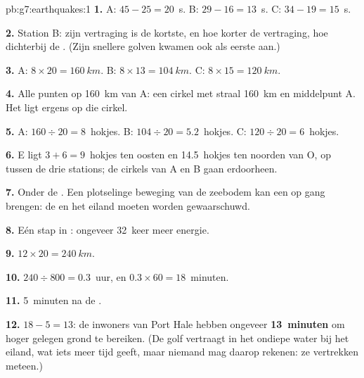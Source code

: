 \begin{solution}{pb:g7:earthquakes:1}
\textbf{1.} A: $45 - 25 = 20$~s. B: $29 - 16 = 13$~s. C: $34 - 19 =
15$~s.

\textbf{2.} Station B: zijn vertraging is de kortste, en hoe korter de
vertraging, hoe dichterbij de . (Zijn snellere golven kwamen ook
als eerste aan.)

\textbf{3.} A: $8 \times 20 = \qty{160}{km}$. B: $8 \times 13 =
\qty{104}{km}$. C: $8 \times 15 = \qty{120}{km}$.

\textbf{4.} Alle punten op \qty{160}{km} van A: een cirkel met straal
\qty{160}{km} en middelpunt A. Het  ligt ergens op die cirkel.

\textbf{5.} A: $160 \div 20 = 8$~hokjes. B: $104 \div 20 = 5.2$~hokjes.
C: $120 \div 20 = 6$~hokjes.

\textbf{6.} E ligt $3 + 6 = 9$~hokjes ten oosten en 14.5~hokjes ten
noorden van O, op  tussen de drie stations; de cirkels van A en B gaan
erdoorheen.

\textbf{7.} Onder de . Een plotselinge beweging van de zeebodem kan een
 op gang brengen: de  en het eiland moeten worden
gewaarschuwd.

\textbf{8.} Eén stap in : ongeveer 32~keer meer energie.

\textbf{9.} $12 \times 20 = \qty{240}{km}$.

\textbf{10.} $240 \div 800 = 0.3$~uur, en $0.3 \times 60 = 18$~minuten.

\textbf{11.} 5~minuten na de .

\textbf{12.} $18 - 5 = 13$: de inwoners van Port Hale hebben ongeveer
\textbf{13~minuten} om hoger gelegen grond te bereiken. (De golf vertraagt
in het ondiepe water bij het eiland, wat iets meer tijd geeft, maar
niemand mag daarop rekenen: ze vertrekken meteen.)
\end{solution}
